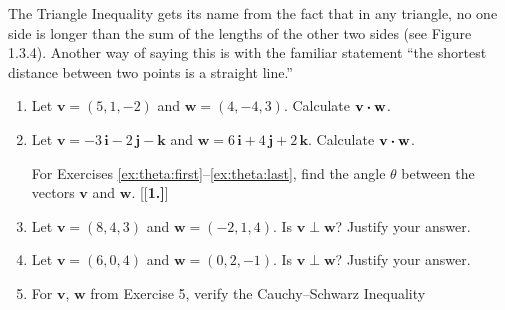\piccaption[]{}
\par The Triangle Inequality gets its name from the fact that in any triangle, no one side is longer than the sum of
the lengths of the other two sides (see Figure 1.3.4). Another way of saying this is with the familiar statement ``the
shortest distance between two points is a straight line.''


\startexercises\label{sec1dot3}
\begin{enumerate}[\bfseries 1.]
 \item Let $\mathbf{v} = (5,1,-2)$ and $\mathbf{w} = (4,-4,3)$. Calculate $\mathbf{v} \bm{\cdot} \mathbf{w}$.
 \item Let $\mathbf{v} = -3\,\mathbf{i} - 2\,\mathbf{j} - \mathbf{k}$ and
  $\mathbf{w} = 6\,\mathbf{i} + 4\,\mathbf{j} + 2\,\mathbf{k}$. Calculate $\mathbf{v} \bm{\cdot} \mathbf{w}$.
\par\noindent For Exercises \ref{ex:theta:first}--\ref{ex:theta:last}, find the angle $\theta$ between the vectors $\mathbf{v}$ and $\mathbf{w}$.
[{[\bfseries 1.]}]
 \item Let $\mathbf{v} = (8,4,3)$ and $\mathbf{w} = (-2,1,4)$. Is $\mathbf{v} \perp \mathbf{w}$? Justify your answer.
 \item Let $\mathbf{v} = (6,0,4)$ and $\mathbf{w} = (0,2,-1)$. Is $\mathbf{v} \perp \mathbf{w}$? Justify your answer.
 \item For $\mathbf{v}$, $\mathbf{w}$ from Exercise 5, verify the Cauchy--Schwarz Inequality

\end{enumerate}
